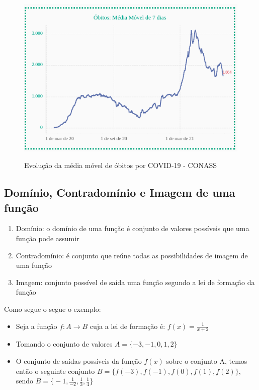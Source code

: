 \begin{multicols*}{2}
    \begin{figure}[H]
        \centering
        \caption{Evolução da média móvel de óbitos por COVID-19 - CONASS}
        \includegraphics[scale=0.5]{assets/rafael/img4.png}
        \label{fig:covid}
    \end{figure}


    \subsection*{Domínio, Contradomínio e Imagem de uma função}

    \begin{enumerate}[wide, labelwidth=!, labelindent=0pt]
        \item Domínio: o domínio de uma função é conjunto de valores possíveis que uma função pode 				assumir
        \item Contradomínio: é conjunto que reúne todas as possibilidades de imagem de uma função
        \item Imagem: conjunto possível de saída uma função segundo a lei de formação da função
    \end{enumerate}
    Como segue o segue o exemplo:

    \begin{itemize}[wide, labelwidth=!, labelindent=0pt]
        \item Seja a função $f: A \rightarrow B$ cuja a lei de formação é: $f(x) = \frac{1}{x+2}$
        \item Tomando o conjunto de valores $A = \{-3,-1,0,1,2 \}$
        \item O conjunto de saídas possíveis da função $f(x)$ sobre o conjunto A, temos então o 				seguinte conjunto $B = \{f(-3),f(-1),f(0),f(1),f(2) \}$, sendo
              $B = \Big\{ -1, \frac{1}{-2}, \frac{1}{3}, \frac{1}{4} \Big\}$
    \end{itemize}



\end{multicols*}
